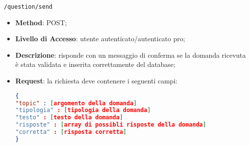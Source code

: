 	\item \texttt{/question/send}
		\begin{itemize}
			\item \textbf{Method}: POST;
			\item \textbf{Livello di Accesso}: utente autenticato/autenticato pro;
			\item \textbf{Descrizione}: risponde con un messaggio di conferma se la domanda ricevuta è stata validata e inserita correttamente del database;
			\item \textbf{Request}: la richiesta deve contenere i seguenti campi:
\begin{lstlisting}[language=json,firstnumber=1]
{
"topic" : [argomento della domanda]
"tipologia" : [tipologia della domanda]
"testo" : [testo della domanda]
"risposte" : [array di possibli risposte della domanda]
"corretta" : [risposta corretta]
}
\end{lstlisting}
		\end{itemize}